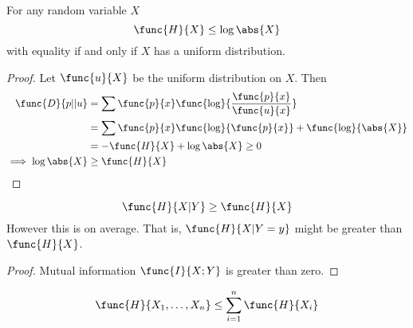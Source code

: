  \begin{theorem}
       For any random variable \(X\)
       \begin{equation*}
             \func{H}{X} \leq \log \abs{X}
       \end{equation*}
       with equality if and only if \(X\) has a uniform distribution.
 \end{theorem}

 \begin{proof}
       Let \(\func{u}{X}\) be the uniform distribution on \(X\). Then 
       \begin{align*}
             \func{D}{p || u} &= \sum \func{p}{x} \func{\log}{\dfrac{\func{p}{x}}{\func{u}{x}}}\\
             &= \sum \func{p}{x} \func{\log}{\func{p}{x}} + \func{\log}{\abs{X}}\\
             &= -\func{H}{X} + \log \abs{X} \geq 0\\
             \implies \log \abs{X} &\geq \func{H}{X}
       \end{align*}
 \end{proof}

 \begin{theorem}
      \begin{equation*}
            \func{H}{X|Y} \geq \func{H}{X}
      \end{equation*}
      However this is on average. That is, \(\func{H}{X|Y = y}\) might be greater than \(\func{H}{X}\).
 \end{theorem}
 \begin{proof}
      Mutual information \(\func{I}{X;Y}\) is greater than zero.
 \end{proof}

 \begin{corollary}
      \begin{equation*}
            \func{H}{X_1, \dots , X_n} \leq \sum_{i=1}^n \func{H}{X_i}
      \end{equation*}
 \end{corollary}

